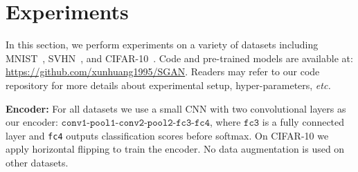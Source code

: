 \documentclass[10pt,twocolumn,letterpaper]{article}
\newcommand{\vpara}[1]{\vspace{0.1in}\noindent\textbf{#1}}
\begin{document}





 
\section{Experiments}
\label{experiments}


In this section, we perform experiments on a variety of datasets including MNIST~\cite{lecun1998gradient}, SVHN~\cite{netzer2011reading}, and CIFAR-10~\cite{krizhevsky2009learning}.  
Code and pre-trained models are available at: \url{https://github.com/xunhuang1995/SGAN}. Readers may refer to our code repository for more details about experimental setup, hyper-parameters, \emph{etc.}	

\vpara{Encoder:} For all datasets we use a small CNN with two convolutional layers as our encoder: $\texttt{conv1-pool1-conv2-pool2-fc3-fc4}$, where $\texttt{fc3}$ is a fully connected layer %
and \texttt{fc4} outputs classification scores before softmax. %
On CIFAR-10 we apply horizontal flipping to train the encoder. No data augmentation is used on other datasets. %
\end{document}
